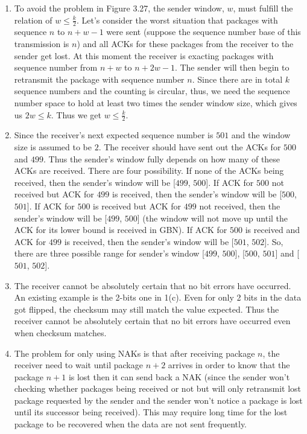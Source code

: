 \documentclass[12pt]{article}
\begin{document}
\begin{singlespace}
\begin{enumerate}
\begin{itemize}
	\end{itemize}
\item
	To avoid the problem in Figure 3.27, the sender window, $w$, must fulfill the relation of $w \leqslant \frac{k}{2}$. Let's consider the worst situation that packages with sequence $n$ to $n+w-1$ were sent (suppose the sequence number base of this transmission is $n$) and all ACKs for these packages from the receiver to the sender get lost. At this moment the receiver is exacting packages with sequence number from $n+w$ to $n+2w-1$. The sender will then begin to retransmit the package with sequence number $n$. Since there are in total $k$ sequence numbers and the counting is circular, thus, we need the sequence number space to hold at least two times the sender window size, which gives us $2w \leqslant k$. Thus we get $w \leqslant \frac{k}{2}$.
\item
	Since the receiver's next expected sequence number is $501$ and the window size is assumed to be $2$. The receiver should have sent out the ACKs for $500$ and $499$. Thus the sender's window fully depends on how many of these ACKs are received. There are four possibility. If none of the ACKs being received, then the sender's window will be [$499$, $500$]. If ACK for $500$ not received but ACK for $499$ is received, then the sender's window will be [$500$, $501$]. If ACK for $500$ is received but ACK for $499$ not received, then the sender's window will be [$499$, $500$] (the window will not move up until the ACK for its lower bound is received in GBN). If ACK for $500$ is received and ACK for $499$ is received, then the sender's window will be [$501$, $502$]. So, there are three possible range for sender's window [$499$, $500$], [$500$, $501$] and [$501$, $502$].
\item
	The receiver cannot be absolutely certain that no bit errors have occurred. An existing example is the 2-bits one in 1(c). Even for only 2 bits in the data got flipped, the checksum may still match the value expected. Thus the receiver cannot be absolutely certain that no bit errors have occurred even when checksum matches.
\item
	The problem for only using NAKs is that after receiving package $n$, the receiver need to wait until package $n+2$ arrives in order to know that the package $n+1$ is lost then it can send back a NAK (since the sender won't checking whether packages being received or not but will only retransmit lost package requested by the sender and the sender won't notice a package is lost until its successor being received). This may require long time for the lost package to be recovered when the data are not sent frequently.\\

\end{enumerate}
\end{singlespace}
\end{document}

